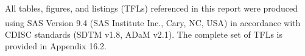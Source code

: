 \begin{notebox}
All tables, figures, and listings (TFLs) referenced in this report were produced using SAS\textsuperscript{\textregistered} Version 9.4 (SAS Institute Inc., Cary, NC, USA) in accordance with CDISC standards (SDTM v1.8, ADaM v2.1). The complete set of TFLs is provided in Appendix 16.2.
\end{notebox}

\newpage

